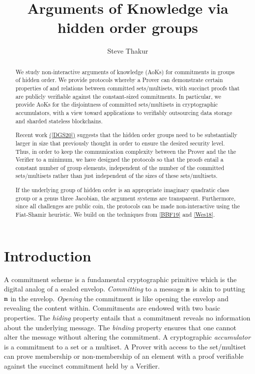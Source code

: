 \documentclass[11pt, lettersize, notitlepage, leqno, footskip=0.6cm]{article}
\numberwithin{equation}{section}
\begin{document}
 
\title{Arguments of Knowledge via hidden order groups}
\author{Steve Thakur}
\affil{}
\date{\vspace{-6ex}}
 
\maketitle

\begin{abstract} We study non-interactive arguments of knowledge (AoKs) for commitments in groups of hidden order. We provide protocols whereby a Prover can demonstrate certain properties of and relations between committed sets/multisets, with succinct proofs that are publicly verifiable against the constant-sized commitments. In particular, we provide AoKs for the disjointness of committed sets/multisets in cryptographic accumulators, with a view toward applications to verifiably outsourcing data storage and sharded stateless blockchains. 

Recent work \hyperlink{DGS20}{([DGS20])} suggests that the hidden order groups need to be substantially larger in size that previously thought in order to ensure the desired security level. Thus, in order to keep the communication complexity between the Prover and the the Verifier to a minimum, we have designed the protocols so that the proofs entail a constant number of group elements, independent of the number of the committed sets/multisets rather than just independent of the sizes of these sets/multisets.

If the underlying group of hidden order is an appropriate imaginary quadratic class group or a genus three Jacobian, the argument systems are transparent. Furthermore, since all challenges are public coin, the protocols can be made non-interactive using the Fiat-Shamir heuristic. We build on the techniques from \hyperlink{BBF19}{[BBF19]} and \hyperlink{Wes18}{[Wes18]}.

\end{abstract}

\section{\fontsize{12}{12}\selectfont Introduction  }

A commitment scheme is a fundamental cryptographic primitive which is the digital analog of a sealed envelop. \textit{Committing} to a message $\tt{m}$ is akin to putting $\tt{m}$ in the envelop. \textit{Opening} the commitment is like opening the envelop and revealing the content within. Commitments are endowed with two basic properties. The \textit{hiding} property entails that a commitment reveals no information about the underlying message. The \textit{binding} property ensures that one cannot alter the message without altering the commitment. A cryptographic \textit{accumulator} is a commitment to a set or a multiset. A Prover with access to the set/multiset can prove membership or non-membership of an element with a proof verifiable against the succinct commitment held by a Verifier. 
\end{document}
